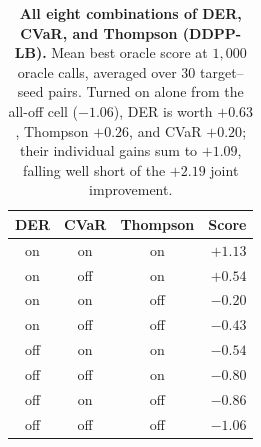 \documentclass{article}
\begin{document}
\begin{table}[H]
\centering
\small
\begin{tabular}{@{}cccr@{}}
\toprule
DER & CVaR & Thompson & Score \\
\midrule
on  & on  & on  & $+1.13$ \\
on  & off & on  & $+0.54$ \\
on  & on  & off & $-0.20$ \\
on  & off & off & $-0.43$ \\
off & on  & on  & $-0.54$ \\
off & off & on  & $-0.80$ \\
off & on  & off & $-0.86$ \\
off & off & off & $-1.06$ \\
\bottomrule
\end{tabular}

\vspace{6pt}
\caption{\textbf{All eight combinations of DER, CVaR, and Thompson (DDPP-LB).} Mean best oracle score at $1{,}000$ oracle calls, averaged over $30$ target--seed pairs. Turned on alone from the all-off cell ($-1.06$), DER is worth $+0.63$, Thompson $+0.26$, and CVaR $+0.20$; their individual gains sum to $+1.09$, falling well short of the $+2.19$ joint improvement.}
\label{tab:factorial}
\end{table}
\vspace{-22pt}
\end{document}

